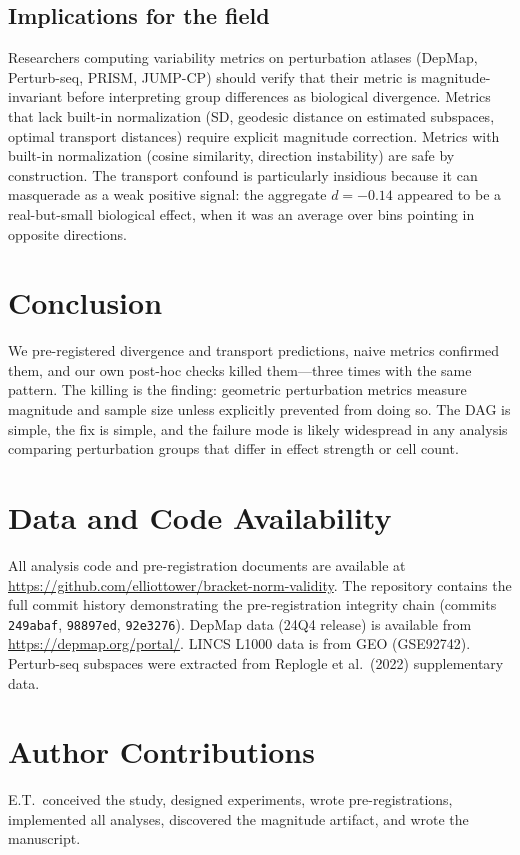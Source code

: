 \documentclass[11pt]{article}
\begin{document}
\subsection{Implications for the field}

Researchers computing variability metrics on perturbation atlases
(DepMap, Perturb-seq, PRISM, JUMP-CP) should verify that their metric is
magnitude-invariant before interpreting group differences as biological
divergence. Metrics that lack built-in normalization (SD, geodesic
distance on estimated subspaces, optimal transport distances) require
explicit magnitude correction. Metrics with built-in normalization
(cosine similarity, direction instability) are safe by construction. The
transport confound is particularly insidious because it can masquerade
as a weak positive signal: the aggregate $d = -0.14$ appeared to be
a real-but-small biological effect, when it was an average over bins
pointing in opposite directions.

\section{Conclusion}

We pre-registered divergence and transport predictions, naive metrics
confirmed them, and our own post-hoc checks killed them---three times
with the same pattern. The killing is the finding: geometric
perturbation metrics measure magnitude and sample size unless explicitly
prevented from doing so. The DAG is simple, the fix is simple, and the
failure mode is likely widespread in any analysis comparing perturbation
groups that differ in effect strength or cell count.

\section*{Data and Code Availability}

All analysis code and pre-registration documents are available at
\url{https://github.com/elliottower/bracket-norm-validity}. The
repository contains the full commit history demonstrating the
pre-registration integrity chain (commits \texttt{249abaf},
\texttt{98897ed}, \texttt{92e3276}). DepMap data (24Q4 release) is
available from \url{https://depmap.org/portal/}. LINCS L1000 data is
from GEO (GSE92742). Perturb-seq subspaces were extracted from Replogle
et al.\ (2022) supplementary data.

\section*{Author Contributions}

E.T.\ conceived the study, designed experiments, wrote pre-registrations,
implemented all analyses, discovered the magnitude artifact, and wrote
the manuscript.



\end{document}
